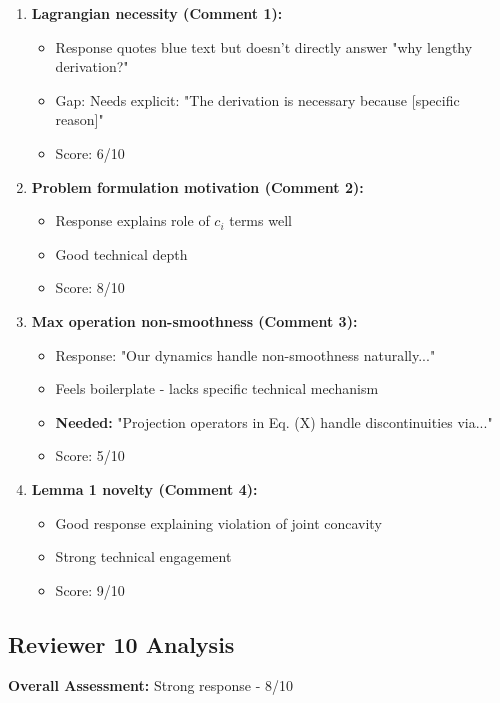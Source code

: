 \documentclass[11pt]{article}
\begin{document}
\begin{enumerate}
\item \textbf{Lagrangian necessity (Comment 1):}
   \begin{itemize}
   \item Response quotes blue text but doesn't directly answer "why lengthy derivation?"
   \item \textcolor{warning}{Gap:} Needs explicit: "The derivation is necessary because [specific reason]"
   \item Score: 6/10
   \end{itemize}

\item \textbf{Problem formulation motivation (Comment 2):}
   \begin{itemize}
   \item Response explains role of $c_i$ terms well
   \item Good technical depth
   \item Score: 8/10
   \end{itemize}

\item \textbf{Max operation non-smoothness (Comment 3):}
   \begin{itemize}
   \item Response: "Our dynamics handle non-smoothness naturally..."
   \item \textcolor{warning}{Feels boilerplate} - lacks specific technical mechanism
   \item \textbf{Needed:} "Projection operators in Eq. (X) handle discontinuities via..."
   \item Score: 5/10
   \end{itemize}

\item \textbf{Lemma 1 novelty (Comment 4):}
   \begin{itemize}
   \item Good response explaining violation of joint concavity
   \item Strong technical engagement
   \item Score: 9/10
   \end{itemize}
\end{enumerate}

\subsection{Reviewer 10 Analysis}

\textbf{Overall Assessment:} \textcolor{success}{Strong response - 8/10}
\end{document}
